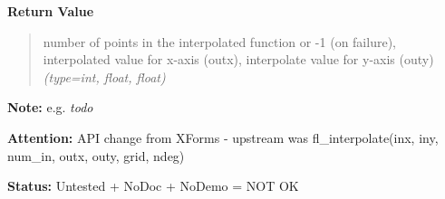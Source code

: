 \begin{boxedminipage}{\funcwidth}
\begin{quote}
      \end{quote}

      \textbf{Return Value}
    \vspace{-1ex}

      \begin{quote}

number of points in the interpolated function or -1 (on failure),
interpolated value for x-axis (outx), interpolate value for y-axis
(outy)
      {\it (type=int, float, float)}

      \end{quote}

\textbf{Note:} 
e.g. \emph{todo}


\textbf{Attention:} 
API change from XForms - upstream was
fl\_interpolate(inx, iny, num\_in, outx, outy, grid, ndeg)


\textbf{Status:} 
Untested + NoDoc + NoDemo = NOT OK


    \end{boxedminipage}

    \label{xformslib:flxyplot:fl_spline_interpolate}

    \vspace{0.5ex}

